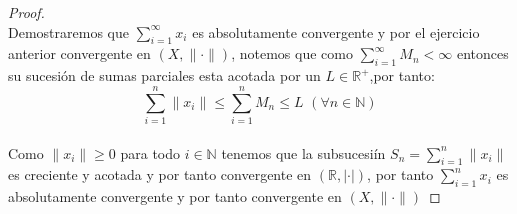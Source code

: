 \documentclass[11pt,letterpaper]{article}
\newcommand{\R}{\mathbb{R}}
\newcommand{\N}{\mathbb{N}}
\begin{document}
\begin{proof}\,\\
    Demostraremos que $\sum_{i=1}^{\infty} x_i$ es absolutamente convergente y por el ejercicio anterior convergente en $(X,\|\cdot\|)$, notemos que como $\sum_{i=1}^{\infty}M_n<\infty$ entonces su sucesi\'on de sumas parciales esta acotada por un $L\in \R^{+}$,por tanto:
    \begin{equation*}
        \sum_{i=1}^{n}\|x_i\|\leq \sum_{i=1}^{n}M_n\leq L\,\,(\forall n\in \N)
    \end{equation*}\,\\
    Como $\|x_i\|\geq 0$ para todo $i\in \N$ tenemos que la subsucesi\'in $S_n=\sum_{i=1}^n\|x_i\|$ es creciente y acotada y por tanto convergente en $(\R,|\cdot|)$, por tanto $\sum_{i=1}^nx_i$ es absolutamente convergente y por tanto convergente en $(X,\|\cdot\|)$    
\end{proof}
\end{document}
